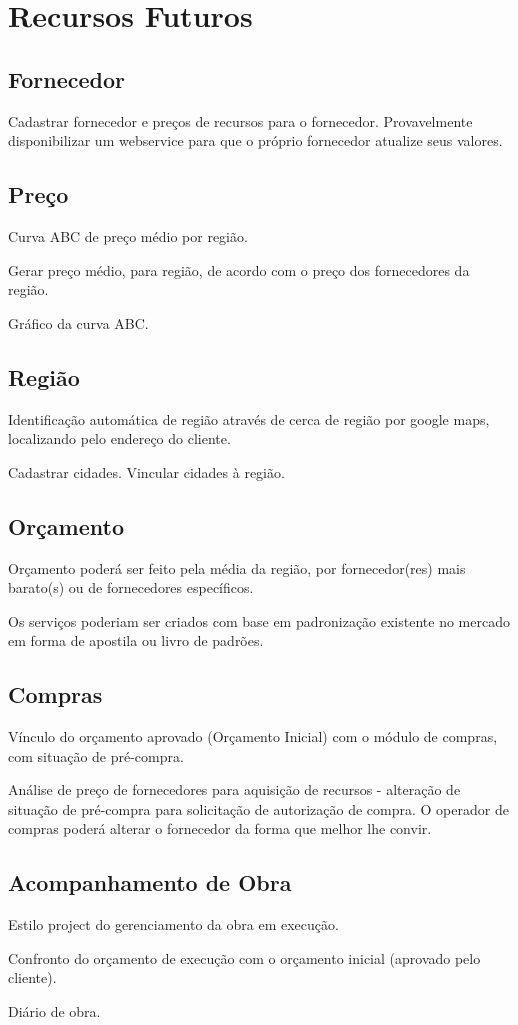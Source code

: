 \chapter{Recursos Futuros}

\section{Fornecedor}

Cadastrar fornecedor e preços de recursos para o fornecedor. Provavelmente disponibilizar um webservice para que o próprio fornecedor atualize seus valores.

\section{Preço}

Curva ABC de preço médio por região.

Gerar preço médio, para região, de acordo com o preço dos fornecedores da região.

Gráfico da curva ABC.

\section{Região}

Identificação automática de região através de cerca de região por google maps, localizando pelo endereço do cliente.

Cadastrar cidades. Vincular cidades à região.

\section{Orçamento}

Orçamento poderá ser feito pela média da região, por fornecedor(res) mais barato(s) ou de fornecedores específicos.

Os serviços poderiam ser criados com base em padronização existente no mercado em forma de apostila ou livro de padrões.

\section{Compras}

Vínculo do orçamento aprovado (Orçamento Inicial) com o módulo de compras, com situação de pré-compra.

Análise de preço de fornecedores para aquisição de recursos - alteração de situação de pré-compra para solicitação de autorização de compra. O operador de compras poderá alterar o fornecedor da forma que melhor lhe convir.

\section{Acompanhamento de Obra}

Estilo project do gerenciamento da obra em execução.

Confronto do orçamento de execução com o orçamento inicial (aprovado pelo cliente).

Diário de obra.



